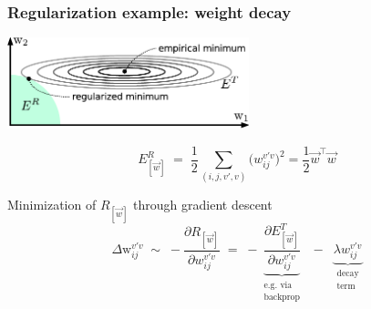 \begin{frame}\frametitle{Regularization example: weight decay}


	\begin{center}
		\includegraphics[width=7cm]{img/empirical_vs_regularized}
	\end{center}
	
	\begin{equation}
		E_{[\vec{w}]}^R \;=\; \frac{1}{2} \sum_{(i, j, v', v)} 
			\big( {w}_{ij}^{v'v} \big)^2 = \frac{1}{2} \vec w^\top \vec w
	\end{equation}
	
	\begin{block}{Minimization of $R_{[\vec w]}$ through gradient descent}
		\begin{equation}
			\Delta \mathrm{w}_{ij}^{v'v} \;\sim\; 
				-\frac{\partial R_{[\vec w]}}{\partial {w}_{ij}^{v'v}}
			\;=\; - \underbrace{\frac{\partial E^T_{[\vec w]}}%
				{\partial {w}_{ij}^{v'v}}}_{
				\substack{\text{e.g. via} \\ \text{backprop}}}
			\;\;-\;\; \underbrace{\lambda {w}_{ij}^{v'v}}_{
				\substack{\text{decay} \\ \text{term}}}
		\end{equation}
	\end{block}
	
\end{frame}


